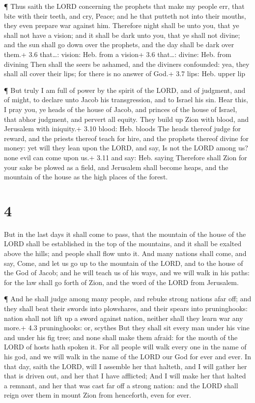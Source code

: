  ¶ Thus saith the LORD concerning the prophets that make my
people err, that bite with their teeth, and cry, Peace; and he that
putteth not into their mouths, they even prepare war against him.
 Therefore night shall be unto you, that ye shall not have a
vision; and it shall be dark unto you, that ye shall not divine; and the
sun shall go down over the prophets, and the day shall be dark over
them.+ 3.6 that\ldots: vision: Heb. from a vision+ 3.6 that\ldots:
divine: Heb. from divining  Then shall the seers be ashamed,
and the diviners confounded: yea, they shall all cover their lips; for
there is no answer of God.+ 3.7 lips: Heb. upper lip

 ¶ But truly I am full of power by the spirit of the LORD,
and of judgment, and of might, to declare unto Jacob his transgression,
and to Israel his sin.  Hear this, I pray you, ye heads of
the house of Jacob, and princes of the house of Israel, that abhor
judgment, and pervert all equity.  They build up Zion with
blood, and Jerusalem with iniquity.+ 3.10 blood: Heb. bloods
 The heads thereof judge for reward, and the priests
thereof teach for hire, and the prophets thereof divine for money: yet
will they lean upon the LORD, and say, Is not the LORD among us? none
evil can come upon us.+ 3.11 and say: Heb. saying 
Therefore shall Zion for your sake be plowed as a field, and Jerusalem
shall become heaps, and the mountain of the house as the high places of
the forest.

\hypertarget{section-3}{%
\section{4}\label{section-3}}

 But in the last days it shall come to pass, that the
mountain of the house of the LORD shall be established in the top of the
mountains, and it shall be exalted above the hills; and people shall
flow unto it.  And many nations shall come, and say, Come,
and let us go up to the mountain of the LORD, and to the house of the
God of Jacob; and he will teach us of his ways, and we will walk in his
paths: for the law shall go forth of Zion, and the word of the LORD from
Jerusalem.

 ¶ And he shall judge among many people, and rebuke strong
nations afar off; and they shall beat their swords into plowshares, and
their spears into pruninghooks: nation shall not lift up a sword against
nation, neither shall they learn war any more.+ 4.3 pruninghooks: or,
scythes  But they shall sit every man under his vine and
under his fig tree; and none shall make them afraid: for the mouth of
the LORD of hosts hath spoken it.  For all people will walk
every one in the name of his god, and we will walk in the name of the
LORD our God for ever and ever.  In that day, saith the
LORD, will I assemble her that halteth, and I will gather her that is
driven out, and her that I have afflicted;  And I will make
her that halted a remnant, and her that was cast far off a strong
nation: and the LORD shall reign over them in mount Zion from
henceforth, even for ever.

